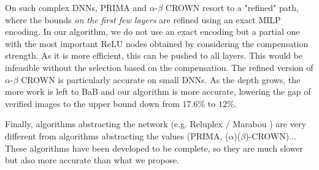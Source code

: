 On such complex DNNs, PRIMA and $\alpha$-$\beta$ CROWN resort to a "refined" path, where the bounds {\em on the first few layers} are refined \cite{MILP2} using an exact MILP encoding. In our algorithm, we do not use an exact encoding but a partial one with the most important ReLU nodes obtained by considering the compensation strength. As it is more efficient, this can be pushed to all layers. This would be infeasible without the selection based on the compensation. The refined version of $\alpha$-$\beta$ CROWN is particularly accurate on small DNNs. As the depth grows, the more work is left to BaB and our algorithm is more accurate, lowering the gap of verified images to the upper bound down from $17.6\%$ to $12\%$.

Finally, algorithms abstracting the network (e.g. Reluplex / Marabou \cite{Reluplex,katz2019marabou}) are very different from algorithms abstracting the values (PRIMA, ($\alpha$)($\beta$)-CROWN)\cite{prima,crown}$\ldots$ These algorithms have been developed to be complete, so they are much slower but also more accurate than what we propose.
